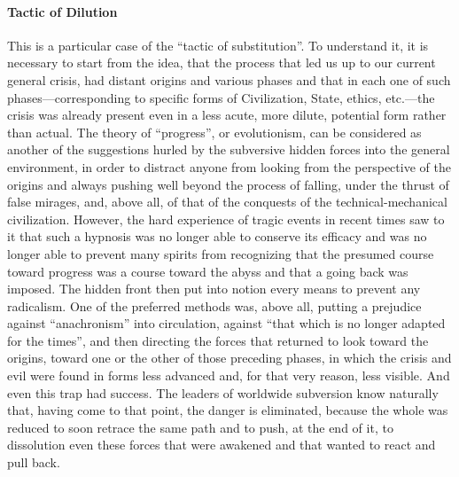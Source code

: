 \paragraph{Tactic of Dilution}


This is a particular case of the ``tactic of substitution''. To understand it, it is necessary to start from the idea, that the process that led us up to our current general crisis, had distant origins and various phases and that in each one of such phases---corresponding to specific forms of Civilization, State, ethics, etc.---the crisis was already present even in a less acute, more dilute, potential form rather than actual. The theory of ``progress'', or evolutionism, can be considered as another of the suggestions hurled by the subversive hidden forces into the general environment, in order to distract anyone from looking from the perspective of the origins and always pushing well beyond the process of falling, under the thrust of false mirages, and, above all, of that of the conquests of the technical-mechanical civilization. However, the hard experience of tragic events in recent times saw to it that such a hypnosis was no longer able to conserve its efficacy and was no longer able to prevent many spirits from recognizing that the presumed course toward progress was a course toward the abyss and that a going back was imposed. The hidden front then put into notion every means to prevent any radicalism. One of the preferred methods was, above all, putting a prejudice against ``anachronism'' into circulation, against ``that which is no longer adapted for the times'', and then directing the forces that returned to look toward the origins, toward one or the other of those preceding phases, in which the crisis and evil were found in forms less advanced and, for that very reason, less visible. And even this trap had success. The leaders of worldwide subversion know naturally that, having come to that point, the danger is eliminated, because the whole was reduced to soon retrace the same path and to push, at the end of it, to dissolution even these forces that were awakened and that wanted to react and pull back.

